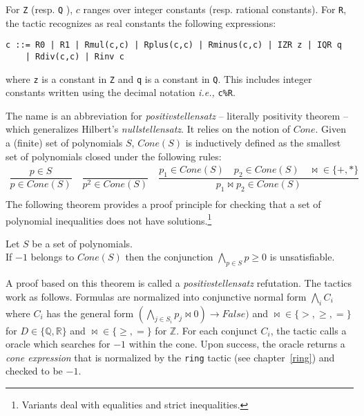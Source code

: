 For {\tt Z} (resp. {\tt Q} ), $c$ ranges over integer constants (resp. rational constants).
For {\tt R}, the tactic recognizes as real constants the following expressions:
\begin{verbatim}
c ::= R0 | R1 | Rmul(c,c) | Rplus(c,c) | Rminus(c,c) | IZR z | IQR q
    | Rdiv(c,c) | Rinv c
\end{verbatim}
where {\tt z} is a constant in {\tt Z} and {\tt q} is a constant in {\tt Q}.
This includes integer constants written using the decimal notation \emph{i.e.,} {\tt c\%R}.

\label{sec:psatz-back}

The name {} is an abbreviation for \emph{positivstellensatz} -- literally positivity theorem -- which
generalizes Hilbert's \emph{nullstellensatz}.
%
It relies on the notion of $\mathit{Cone}$. Given a (finite) set of
polynomials $S$, $\mathit{Cone}(S)$ is inductively defined as the
smallest set of polynomials closed under the following rules:
\[
\begin{array}{l}
\dfrac{p \in S}{p \in \mathit{Cone}(S)} \quad
\dfrac{}{p^2 \in \mathit{Cone}(S)} \quad
\dfrac{p_1 \in \mathit{Cone}(S) \quad p_2 \in \mathit{Cone}(S) \quad
\Join \in \{+,*\}} {p_1 \Join p_2 \in \mathit{Cone}(S)}\\
\end{array}
\]
The following theorem provides a proof principle for checking that a set
of polynomial inequalities does not have solutions.\footnote{Variants
  deal with equalities and strict inequalities.}
\begin{theorem}
  \label{thm:psatz}
  Let $S$ be a set of polynomials.\\
  If ${-}1$ belongs to $\mathit{Cone}(S)$ then the conjunction
  $\bigwedge_{p \in S} p\ge 0$ is unsatisfiable.
\end{theorem}
A proof based on this theorem is called a \emph{positivstellensatz} refutation.
%
The tactics work as follows. Formulas are normalized into conjunctive normal form $\bigwedge_i C_i$ where
$C_i$ has the general form $(\bigwedge_{j\in S_i} p_j \Join 0) \to \mathit{False})$ and $\Join \in \{>,\ge,=\}$ for $D\in
\{\mathbb{Q},\mathbb{R}\}$ and $\Join \in \{\ge, =\}$ for $\mathbb{Z}$.
%
For each conjunct $C_i$, the tactic calls a oracle which searches for $-1$ within the cone.
%
Upon success, the oracle returns a \emph{cone expression} that is normalized by the {\tt ring} tactic (see chapter~\ref{ring}) and checked to be
$-1$.


